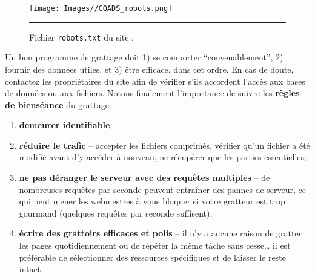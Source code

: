 \begin{figure}[t]
\centering
\texttt{[image: Images//CQADS\_robots.png]}
\caption{Fichier \texttt{robots.txt} du site  .}\hrule\label{fig:robots}
\end{figure}
\afterpage{\FloatBarrier}
\newl Un bon programme de grattage doit 1) se comporter ``convenablement'', 2) fournir des données utiles, et 3) être efficace, dans cet ordre. En cas de doute, contactez les propriétaires du site afin de vérifier s'ils accordent l'accès aux bases de données ou aux fichiers. 
\newpage\noindent Notons finalement l'importance de suivre les \textbf{règles de bienséance} du grattage:
\begin{enumerate}[noitemsep]
    \item \textbf{demeurer identifiable};
    \item \textbf{réduire le trafic} -- accepter les fichiers comprimés, vérifier qu'un fichier a été modifié avant d'y accéder à nouveau, ne récupérer que les parties essentielles;
    \item \textbf{ne pas déranger le serveur avec des requêtes multiples} -- de nombreuses requêtes par seconde peuvent entraîner des pannes de serveur, ce qui peut mener les webmestres à vous bloquer si votre gratteur est trop gourmand (quelques requêtes par seconde suffisent);
    \item \textbf{écrire des grattoirs efficaces et polis} -- il n'y a aucune raison de gratter les pages quotidiennement ou de répéter la même tâche sans cesse… il est préférable de sélectionner des ressources spécifiques et de laisser le reste intact. 
\end{enumerate}
